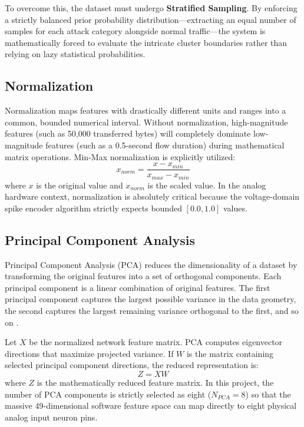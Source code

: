 \documentclass{ieeeaccess}
\begin{document}
To overcome this, the dataset must undergo \textbf{Stratified Sampling}. By enforcing a strictly balanced prior probability distribution—extracting an equal number of samples for each attack category alongside normal traffic—the system is mathematically forced to evaluate the intricate cluster boundaries rather than relying on lazy statistical probabilities.

\subsection{Normalization}

Normalization maps features with drastically different units and ranges into a common, bounded numerical interval. Without normalization, high-magnitude features (such as 50,000 transferred bytes) will completely dominate low-magnitude features (such as a 0.5-second flow duration) during mathematical matrix operations. Min-Max normalization is explicitly utilized:
\begin{equation}
x_{norm} = \frac{x - x_{min}}{x_{max} - x_{min}}
\end{equation}
where $x$ is the original value and $x_{norm}$ is the scaled value. In the analog hardware context, normalization is absolutely critical because the voltage-domain spike encoder algorithm strictly expects bounded $[0.0, 1.0]$ values.

\subsection{Principal Component Analysis}

Principal Component Analysis (PCA) reduces the dimensionality of a dataset by transforming the original features into a set of orthogonal components. Each principal component is a linear combination of original features. The first principal component captures the largest possible variance in the data geometry, the second captures the largest remaining variance orthogonal to the first, and so on \cite{Jolliffe2016}.

Let $X$ be the normalized network feature matrix. PCA computes eigenvector directions that maximize projected variance. If $W$ is the matrix containing selected principal component directions, the reduced representation is:
\begin{equation}
Z = XW
\end{equation}
where $Z$ is the mathematically reduced feature matrix. In this project, the number of PCA components is strictly selected as eight ($N_{PCA}=8$) so that the massive 49-dimensional software feature space can map directly to eight physical analog input neuron pins.
\end{document}
